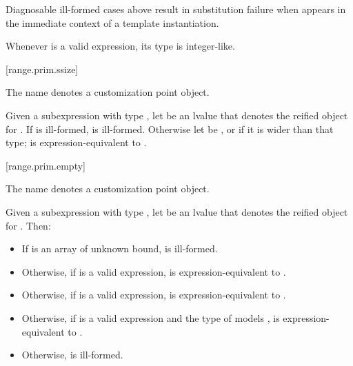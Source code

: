 \pnum
\begin{note}
Diagnosable ill-formed cases above
result in substitution failure when 
appears in the immediate context of a template instantiation.
\end{note}

\pnum
\begin{note}
Whenever  is a valid expression, its
type is integer-like.
\end{note}

[range.prim.ssize]{}
%

\pnum
The name  denotes
a customization point object.

\pnum
Given a subexpression  with type ,
let  be an lvalue that denotes the reified object for .
If  is ill-formed,
 is ill-formed.
Otherwise let  be
, or
 if it is wider than that type;
 is expression-equivalent to
.

[range.prim.empty]{}
%

\pnum
The name  denotes a customization point
object.

\pnum
Given a subexpression  with type ,
let  be an lvalue that denotes the reified object for .
Then:
\begin{itemize}
\item
  If  is an array of unknown bound,
   is ill-formed.

\item
  Otherwise, if  is a valid expression,
   is expression-equivalent to
  .

\item
  Otherwise, if  is a valid expression,
   is expression-equiva\-lent to
  .

\item
  Otherwise, if 
  is a valid expression and
  the type of  models ,
   is expression-equivalent to
  .

\item
  Otherwise,  is ill-formed.
\end{itemize}

